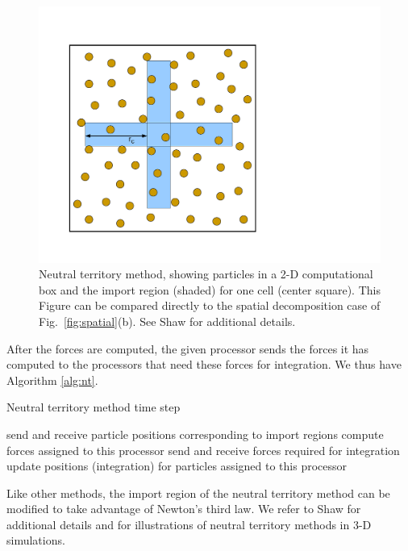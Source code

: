 \begin{figure}[htb]
\begin{center}
\includegraphics[clip=true,viewport=70 70 506 506,scale=.40]{mdchapter/fig-ntmethod}
\caption{Neutral territory method, showing particles in a 2-D computational box
and the import region (shaded) for one cell (center square).  This Figure can
be compared directly to the spatial decomposition case of Fig.~\ref{fig:spatial}(b).
See Shaw \cite{shaw} for additional details.
}
\label{fig:nt}
\end{center}
\end{figure}

After the forces are computed, the given processor sends the forces
it has computed to the processors that need these forces for integration.
We thus have Algorithm \ref{alg:nt}.
\begin{algorithm}
\caption{Neutral territory method time step}
\label{alg:nt}
\begin{algorithmic}[1]
\STATE send and receive particle positions corresponding to import regions
\STATE compute forces assigned to this processor
\STATE send and receive forces required for integration
\STATE update positions (integration) for particles assigned to this processor
\end{algorithmic}
\end{algorithm}

Like other methods, the import region of the neutral territory method can 
be modified to take advantage of Newton's third law.  We refer to
Shaw \cite{shaw} for additional details and for illustrations of neutral
territory methods in 3-D simulations.

